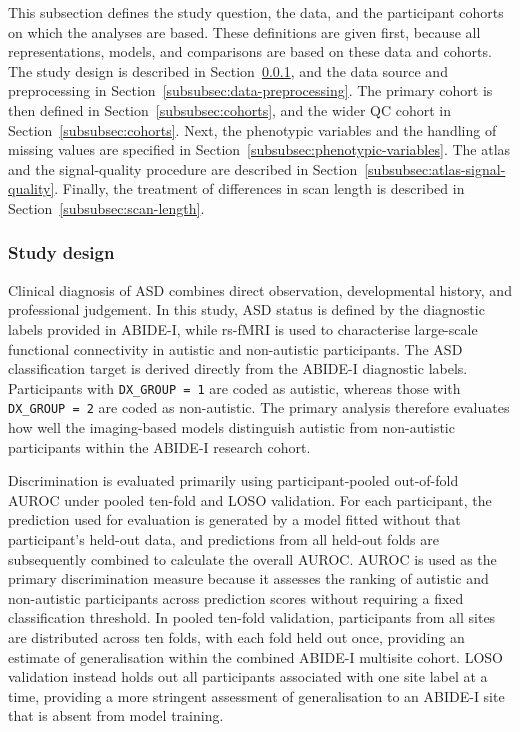 This subsection defines the study question, the data, and the participant cohorts on which
the analyses are based. These definitions are given first, because all representations,
models, and comparisons are based on these data and cohorts. The study design is
described in Section~\ref{subsubsec:study-design}, and the data source and preprocessing in
Section~\ref{subsubsec:data-preprocessing}. The primary cohort is then defined in
Section~\ref{subsubsec:cohorts}, and the wider QC cohort in Section~\ref{subsubsec:cohorts}.
Next, the phenotypic variables and the handling of missing values are specified in
Section~\ref{subsubsec:phenotypic-variables}. The atlas and the signal-quality procedure are described in
Section~\ref{subsubsec:atlas-signal-quality}. Finally, the treatment of differences in scan length is described
in Section~\ref{subsubsec:scan-length}.

\subsubsection{Study design}
\label{subsubsec:study-design}

Clinical diagnosis of ASD combines direct observation,
developmental history, and professional judgement. In this study, ASD status is defined by
the diagnostic labels provided in ABIDE-I, while
rs-fMRI is used to characterise
large-scale functional connectivity in autistic and non-autistic participants. The ASD classification target is derived directly from the ABIDE-I diagnostic labels. Participants with \texttt{DX\_GROUP = 1} are coded as autistic, whereas those with
\texttt{DX\_GROUP = 2} are coded as non-autistic. The primary analysis therefore evaluates
how well the imaging-based models distinguish autistic from non-autistic participants within
the ABIDE-I research cohort.

Discrimination is evaluated primarily using participant-pooled out-of-fold AUROC under pooled ten-fold and
LOSO validation. For each participant, the prediction used for evaluation is
generated by a model fitted without that participant's held-out data, and predictions from
all held-out folds are subsequently combined to calculate the overall AUROC. AUROC is used
as the primary discrimination measure because it assesses the ranking of autistic and
non-autistic participants across prediction scores without requiring a fixed classification
threshold. In pooled ten-fold validation, participants from all sites are distributed across ten folds,
with each fold held out once, providing an estimate of generalisation within the combined
ABIDE-I multisite cohort. LOSO validation instead holds out all participants
associated with one site label at a time, providing a more stringent assessment of
generalisation to an ABIDE-I site that is absent from model training.

